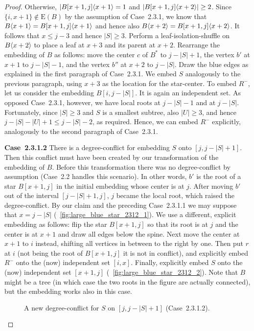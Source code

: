 \documentclass[11pt,a4paper,colorlinks=true,urlcolor=blue,citecolor=red]{article}
\theoremstyle{plain}
\newcommand{\case}[1]{\par\vspace{.5\baselineskip}\noindent\textbf{\sffamily Case~#1}}
\newcommand{\EB}{\mathrm{E}(B)}
\begin{document}
\begin{proof}
  Otherwise, $|B{[x+1,j]}\langle{x+1}\rangle=1$ and
  $|B{[x+1,j]}\langle{x+2}\rangle|\geq2$. Since $\{i,x+1\}\not\in\EB$ by the
  assumption of Case~2.3.1, we know that
  $B\langle{x+1}\rangle=B{[x+1,j]}\langle{x+1}\rangle$ and hence also
  $B\langle{x+2}\rangle=B{[x+1,j]}\langle{x+2}\rangle$. It follows that $x\leq j-3$ and
  hence $|S|\geq 3$. Perform a leaf-isolation-shuffle on $B\langle{x+2}\rangle$
  to place a leaf at $x+3$ and its parent at $x+2$. Rearrange the
  embedding of $B$ as follows: move the center $c$ of $B^*$ to
  $j-|S|+1$, the vertex $b'$ at $x+1$ to $j-|S|-1$, and the vertex $b''$
  at $x+2$ to $j-|S|$. Draw the blue edges as explained in the first
  paragraph of Case~2.3.1. We embed $S$ analogously to the previous
  paragraph, using $x+3$ as the location for the star-center. To embed
  $R^-$, let us consider the embedding $B[i,j-|S|]$. It is again an
  independent set. As opposed Case~2.3.1, however, we have local roots
  at $j-|S|-1$ and at $j-|S|$. Fortunately, since $|S|\geq3$ and $S$ is
  a smallest subtree, also $|U|\geq3$, and hence $j-|S|-|U|+1\leq
  j-|S|-2$, as required. Hence, we can embed $R^-$ explicitly,
  analogously to the second paragraph of Case~2.3.1.

  \case{2.3.1.2} There is a degree-conflict for embedding $S$ onto
  $[j,j-|S|+1]$. Then this conflict must have been created by our
  transformation of the embedding of $B$. Before this transformation
  there was no degree-conflict by assumption (Case~2.2 handles this
  scenario). In other words, $b'$ is the root of a star $B[x+1,j]$ in
  the initial embedding whose center is at $j$. After moving $b'$ out of
  the interval $[j-|S|+1,j]$, $j$ became the local root, which raised
  the degree-conflict. By our claim and the preceding Case~2.3.1.1 we
  may suppose that $x=j-|S|$
  (\figurename~\ref{fig:large_blue_star_2312_1}). We use a different,
  explicit embedding as follows: flip the star $B[x+1,j]$ so that its
  root is at $j$ and the center is at $x+1$ and draw all edges below the
  spine. Next move the center at $x+1$ to $i$ instead, shifting all
  vertices in between to the right by one. Then put $r$ at $i$ (not
  being the root of $B[x+1,j]$ it is not in conflict), and explicitly
  embed $R^-$ onto the (now) independent set $[i,x]$. Finally,
  explicitly embed $S$ onto the (now) independent set $[x+1,j]$
  (\figurename~\ref{fig:large_blue_star_2312_2}). Note that $B$ might be
  a tree (in which case the two roots in the figure are actually
  connected), but the embedding works also in this case.
\begin{figure}[htbp]
    \centering\hfil {}\hfil
    \hfil
    \caption{A new degree-conflict for $S$ on $[j,j-|S|+1]$
      (Case~2.3.1.2).\label{fig:large_blue_star_2312}}
  \end{figure}



\end{proof}
\end{document}

